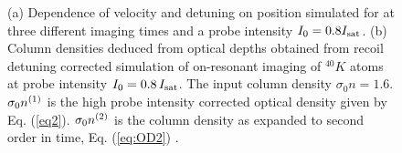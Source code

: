 \documentclass[12pt]{iopart}
\begin{document}
\begin{figure}
\caption{(a) Dependence of velocity and detuning on position simulated for \K{} at three different imaging times and a probe intensity $I_0=0.8 I_{\rm{sat}}$. (b) Column densities deduced from optical depths obtained from recoil detuning corrected simulation of on-resonant imaging of $^{40}K$ atoms at probe intensity $I_0=0.8\, I_{\rm{sat}}$. The input column density $\sigma_0 n=1.6$. $\sigma_0 n^{\rm{(1)}}$ is the high probe intensity corrected optical density given by Eq. (\ref{eq2}). $\sigma_0 n^{\rm{(2)}}$ is the column density as expanded to second order in time, Eq. (\ref{eq:OD2}) \cite{LJLthesis}.}  
\label{fig:expos}
\end{figure}
\end{document}
